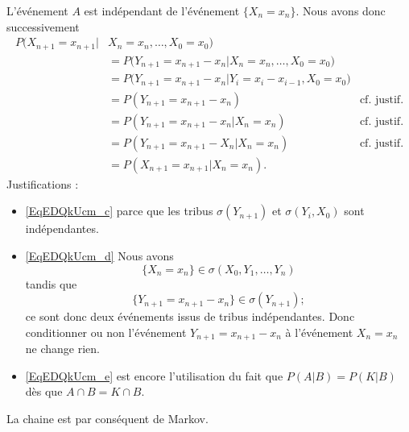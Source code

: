 L'événement \( A\) est indépendant de l'événement \( \{ X_n=x_n \}\). Nous avons donc successivement
\begin{subequations}
	\begin{align}
		P\big( X_{n+1}=x_{n+1}| & X_n=x_n,\ldots,X_0=x_0 \big)    \nonumber                                                                  \\
		                        & =P\big( Y_{n+1}=x_{n+1}-x_n| X_n=x_n,\ldots,X_0=x_0 \big)                                                  \\
		                        & =P\big( Y_{n+1}=x_{n+1}-x_n|  Y_i=x_i-x_{i-1},X_0=x_0\big)                                                 \\
		                        & =P(Y_{n+1}=x_{n+1}-x_n)                                    & \text{cf. justif.}        \label{EqEDQkUcm_c} \\
		                        & =P(Y_{n+1}=x_{n+1}-x_n|X_n=x_n)                            & \text{cf. justif.}   \label{EqEDQkUcm_d}      \\
		                        & =P(Y_{n+1}=x_{n+1}-X_n|X_n=x_n)                            & \text{cf. justif.}   \label{EqEDQkUcm_e}      \\
		                        & =P(X_{n+1}=x_{n+1}|X_n=x_n).
	\end{align}
\end{subequations}
Justifications :
\begin{itemize}
	\item \eqref{EqEDQkUcm_c} parce que les tribus \( \sigma(Y_{n+1})\) et \( \sigma(Y_i,X_0)\) sont indépendantes.
	\item \eqref{EqEDQkUcm_d} Nous avons
	      \begin{equation}
		      \{ X_n=x_n \}\in\sigma(X_0,Y_1,\ldots, Y_n)
	      \end{equation}
	      tandis que
	      \begin{equation}
		      \{ Y_{n+1}=x_{n+1}-x_n \}\in\sigma(Y_{n+1});
	      \end{equation}
	      ce sont donc deux événements issus de tribus indépendantes. Donc conditionner ou non l'événement \( Y_{n+1}=x_{n+1}-x_n\) à l'événement \( X_n=x_n\) ne change rien.
	\item \eqref{EqEDQkUcm_e} est encore l'utilisation du fait que \( P(A|B)=P(K|B)\) dès que \( A\cap B=K\cap B\).

\end{itemize}

La chaine est par conséquent de Markov.

